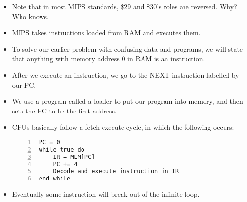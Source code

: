 \documentclass[12pt]{article}
\begin{document}
\begin{itemize}
    \item Note that in most MIPS standards, \$29 and \$30's roles are reversed.  Why?  Who knows.
    \item MIPS takes instructions loaded from RAM and executes them.
    \item To solve our earlier problem with confusing data and programs, we will state that anything with memory address 0 in RAM is an instruction.
    \item After we execute an instruction, we go to the NEXT instruction labelled by our PC.
    \item We use a program called a loader to put our program into memory, and then sets the PC to be the first address.
    \item CPUs basically follow a fetch-execute cycle, in which the following occurs:
    \begin{lstlisting}[mathescape, numbers=left]
PC = 0
while true do
	IR = MEM[PC]
	PC += 4
	Decode and execute instruction in IR
end while
    \end{lstlisting}
    \item Eventually some instruction will break out of the infinite loop.
\end{itemize}
\end{document}
